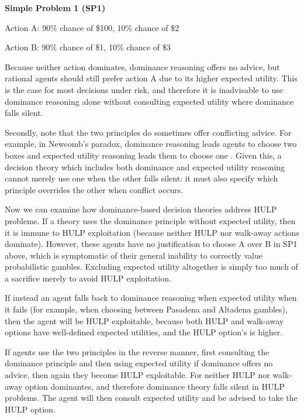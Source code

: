 \documentclass{article}
\begin{document}
\begin{center}
\textbf{Simple Problem 1 (SP1)}

Action A: 90\% chance of \$100, 10\% chance of \$2

Action B: 90\% chance of \$1, 10\% chance of \$3
\end{center}

Because neither action dominates, dominance reasoning offers no advice, but rational agents should still prefer action A due to its higher expected utility. This is the case for most decisions under risk, and therefore it is inadvisable to use dominance reasoning alone without consulting expected utility where dominance falls silent.

Secondly, note that the two principles do sometimes offer conflicting advice. For example, in Newcomb's paradox, dominance reasoning leads agents to choose two boxes and expected utility reasoning leads them to choose one \citep[pg. 110]{resnik1987choices}. Given this, a decision theory which includes both dominance and expected utility reasoning cannot merely use one when the other falls silent: it must also specify which principle overrides the other when conflict occurs.

Now we can examine how dominance-based decision theories address HULP problems. If a theory uses the dominance principle without expected utility, then it is immune to HULP exploitation (because neither HULP nor walk-away actions dominate). However, these agents have no justification to choose A over B in SP1 above, which is symptomatic of their general inability to correctly value probabilistic gambles. Excluding expected utility altogether is simply too much of a sacrifice merely to avoid HULP exploitation.

If instead an agent falls back to dominance reasoning when expected utility when it fails (for example, when choosing between Pasadena and Altadena gambles), then the agent will be HULP exploitable, because both HULP and walk-away options have well-defined expected utilities, and the HULP option's is higher.

If agents use the two principles in the reverse manner, first consulting the dominance principle and then using expected utility if dominance offers no advice, then again they become HULP exploitable. For neither HULP nor walk-away option dominantes, and therefore dominance theory falls silent in HULP problems. The agent will then consult expected utility and be advised to take the HULP option.
\end{document}
